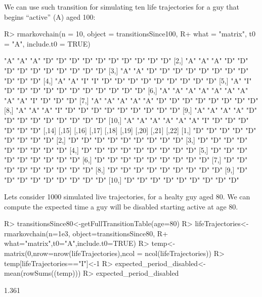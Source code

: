 \documentclass[article,nojss]{jss}
\begin{document}
We can use such transition for simulating ten life trajectories for a guy that begins ``active'' (A) aged 100:

\begin{CodeChunk}

\begin{CodeInput}
R> rmarkovchain(n = 10, object = transitionsSince100,
R+              what = "matrix", t0 = "A", include.t0 = TRUE)
\end{CodeInput}

\begin{CodeOutput}
      [,1] [,2] [,3] [,4] [,5] [,6] [,7] [,8] [,9] [,10] [,11] [,12] [,13]
 [1,] "A"  "A"  "A"  "D"  "D"  "D"  "D"  "D"  "D"  "D"   "D"   "D"   "D"  
 [2,] "A"  "A"  "A"  "D"  "D"  "D"  "D"  "D"  "D"  "D"   "D"   "D"   "D"  
 [3,] "A"  "A"  "D"  "D"  "D"  "D"  "D"  "D"  "D"  "D"   "D"   "D"   "D"  
 [4,] "A"  "A"  "I"  "I"  "D"  "D"  "D"  "D"  "D"  "D"   "D"   "D"   "D"  
 [5,] "A"  "I"  "D"  "D"  "D"  "D"  "D"  "D"  "D"  "D"   "D"   "D"   "D"  
 [6,] "A"  "A"  "A"  "A"  "A"  "A"  "A"  "A"  "A"  "I"   "D"   "D"   "D"  
 [7,] "A"  "A"  "A"  "A"  "A"  "D"  "D"  "D"  "D"  "D"   "D"   "D"   "D"  
 [8,] "A"  "A"  "A"  "I"  "D"  "D"  "D"  "D"  "D"  "D"   "D"   "D"   "D"  
 [9,] "A"  "A"  "A"  "A"  "D"  "D"  "D"  "D"  "D"  "D"   "D"   "D"   "D"  
[10,] "A"  "A"  "A"  "A"  "A"  "A"  "I"  "D"  "D"  "D"   "D"   "D"   "D"  
      [,14] [,15] [,16] [,17] [,18] [,19] [,20] [,21] [,22]
 [1,] "D"   "D"   "D"   "D"   "D"   "D"   "D"   "D"   "D"  
 [2,] "D"   "D"   "D"   "D"   "D"   "D"   "D"   "D"   "D"  
 [3,] "D"   "D"   "D"   "D"   "D"   "D"   "D"   "D"   "D"  
 [4,] "D"   "D"   "D"   "D"   "D"   "D"   "D"   "D"   "D"  
 [5,] "D"   "D"   "D"   "D"   "D"   "D"   "D"   "D"   "D"  
 [6,] "D"   "D"   "D"   "D"   "D"   "D"   "D"   "D"   "D"  
 [7,] "D"   "D"   "D"   "D"   "D"   "D"   "D"   "D"   "D"  
 [8,] "D"   "D"   "D"   "D"   "D"   "D"   "D"   "D"   "D"  
 [9,] "D"   "D"   "D"   "D"   "D"   "D"   "D"   "D"   "D"  
[10,] "D"   "D"   "D"   "D"   "D"   "D"   "D"   "D"   "D"  
\end{CodeOutput}
\end{CodeChunk}

Lets consider 1000 simulated live trajectories, for a healty guy aged 80. We can compute the expected time a guy will be disabled starting active at age 80.

\begin{CodeChunk}

\begin{CodeInput}
R> transitionsSince80<-getFullTransitionTable(age=80)
R> lifeTrajectories<-rmarkovchain(n=1e3, object=transitionsSince80,
R+                                what="matrix",t0="A",include.t0=TRUE)
R> temp<-matrix(0,nrow=nrow(lifeTrajectories),ncol = ncol(lifeTrajectories))
R> temp[lifeTrajectories=="I"]<-1
R> expected_period_disabled<-mean(rowSums((temp)))
R> expected_period_disabled
\end{CodeInput}

\begin{CodeOutput}
[1] 1.361
\end{CodeOutput}
\end{CodeChunk}
\end{document}
